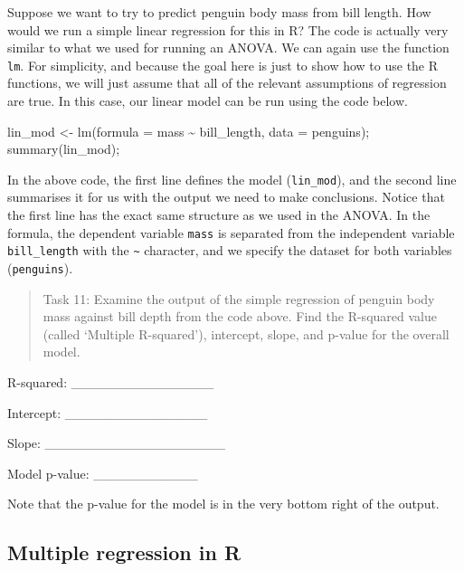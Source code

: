 \documentclass[
]{scrbook}
\newenvironment{Shaded}{\begin{snugshade}}{\end{snugshade}}
\newcommand{\AttributeTok}[1]{\textcolor[rgb]{0.77,0.63,0.00}{#1}}
\newcommand{\FunctionTok}[1]{\textcolor[rgb]{0.00,0.00,0.00}{#1}}
\newcommand{\NormalTok}[1]{#1}
\newcommand{\OtherTok}[1]{\textcolor[rgb]{0.56,0.35,0.01}{#1}}
\newcommand{\SpecialCharTok}[1]{\textcolor[rgb]{0.00,0.00,0.00}{#1}}
\begin{document}
Suppose we want to try to predict penguin body mass from bill length.
How would we run a simple linear regression for this in R?
The code is actually very similar to what we used for running an ANOVA.
We can again use the function \texttt{lm}.
For simplicity, and because the goal here is just to show how to use the R functions, we will just assume that all of the relevant assumptions of regression are true.
In this case, our linear model can be run using the code below.

\begin{Shaded}
\begin{Highlighting}[]
\NormalTok{lin\_mod }\OtherTok{\textless{}{-}} \FunctionTok{lm}\NormalTok{(}\AttributeTok{formula =}\NormalTok{ mass }\SpecialCharTok{\textasciitilde{}}\NormalTok{ bill\_length, }\AttributeTok{data =}\NormalTok{ penguins);}
\FunctionTok{summary}\NormalTok{(lin\_mod);}
\end{Highlighting}
\end{Shaded}

In the above code, the first line defines the model (\texttt{lin\_mod}), and the second line summarises it for us with the output we need to make conclusions.
Notice that the first line has the exact same structure as we used in the ANOVA.
In the formula, the dependent variable \texttt{mass} is separated from the independent variable \texttt{bill\_length} with the \texttt{\textasciitilde{}} character, and we specify the dataset for both variables (\texttt{penguins}).

\begin{quote}
Task 11: Examine the output of the simple regression of penguin body mass against bill depth from the code above. Find the R-squared value (called `Multiple R-squared'), intercept, slope, and p-value for the overall model.
\end{quote}

R-squared: \_\_\_\_\_\_\_\_\_\_\_\_\_\_\_

Intercept: \_\_\_\_\_\_\_\_\_\_\_\_\_\_\_

Slope: \_\_\_\_\_\_\_\_\_\_\_\_\_\_\_\_\_\_\_

Model p-value: \_\_\_\_\_\_\_\_\_\_\_

Note that the p-value for the model is in the very bottom right of the output.

\hypertarget{multiple-regression-in-r}{%
\subsection{Multiple regression in R}\label{multiple-regression-in-r}}
\end{document}
